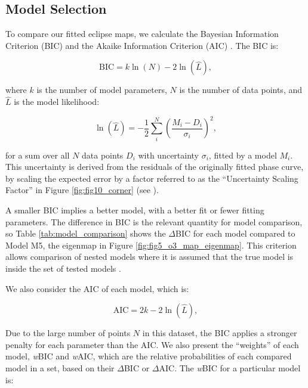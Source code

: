 \documentclass[twocolumn]{aastex631}
\begin{document}
\subsection{Model Selection}\label{sec:results:model_selection}


To compare our fitted eclipse maps, we calculate the Bayesian Information Criterion (BIC) \citep{schwarz1978estimating} and the Akaike Information Criterion (AIC) \citep{akaike1981likelihood}. The BIC is:

\begin{equation}
    \mathrm{BIC}=k \ln (N)- 2 \ln (\widehat{L}),
\end{equation}

where $k$ is the number of model parameters, $N$ is the number of data points, and $\widehat{L}$ is the model likelihood:

\begin{equation}
    \ln (\widehat{L}) = -\frac{1}{2} \sum_{i}^{N} \left( \frac{M_{i} - D_{i}}{\sigma_{i}} \right)^{2},
\end{equation}

for a sum over all $N$ data points $D_{i}$ with uncertainty $\sigma_{i}$, fitted by a model $M_{i}$. This uncertainty is derived from the residuals of the originally fitted phase curve, by scaling the expected error by a factor referred to as the ``Uncertainty Scaling Factor'' in Figure \ref{fig:fig10_corner} (see \citet{bell2023wasp43b}).

A smaller BIC implies a better model, with a better fit or fewer fitting parameters. The difference in BIC is the relevant quantity for model comparison, so Table \ref{tab:model_comparison} shows the $\Delta$BIC for each model compared to Model M5, the eigenmap in Figure \ref{fig:fig5_o3_map_eigenmap}. This criterion allows comparison of nested models where it is assumed that the true model is inside the set of tested models \citep{burnham2004multimodel}. 

We also consider the AIC of each model, which is:

\begin{equation}
    \mathrm{AIC}= 2 k - 2 \ln (\widehat{L}),
\end{equation}

Due to the large number of points $N$ in this dataset, the BIC applies a stronger penalty for each parameter than the AIC. We also present the ``weights'' of each model, \textit{w}BIC and \textit{w}AIC, which are the relative probabilities of each compared model in a set, based on their $\Delta$BIC or $\Delta$AIC. The \textit{w}BIC for a particular model is:
\end{document}
